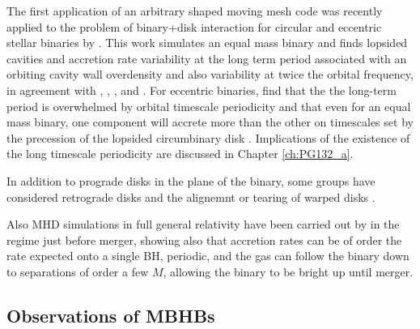 The first application of an arbitrary shaped moving mesh code \citep{AREPO}
was recently applied to the problem of binary+disk interaction for circular
and eccentric stellar binaries by \cite{MunozLai:2016}. This work simulates an
equal mass binary and finds lopsided cavities and accretion rate variability
at the long term period associated with an orbiting cavity wall overdensity
and also variability at twice the orbital frequency, in agreement with
\cite{DHM:2013:MNRAS}, \cite{Farris:2014}, \cite{ShiKrolik:2012}, and
\cite{ShiKrolik:2015}. For eccentric binaries, \cite{MunozLai:2016} find that
the the long-term period is overwhelmed by orbital timescale periodicity and
that even for an equal mass binary, one component will accrete more than the
other on timescales set by the precession of the lopsided circumbinary disk
\citep[see also][]{Dunhill+2015}. Implications of the existence of the long
timescale periodicity are discussed in Chapter \ref{ch:PG132_a}.



In addition to prograde disks in the plane of the binary, some groups have considered retrograde disks \citep{Nixon:2011:LongSim, RoedigSGmigrate:2014, DunhillNixon:2014, BankertShiKrolik:2015, NixonLubow:RetroRes:2015, AmaroSeoane:RetroDiscs:2016} and the alignemnt or tearing of warped disks \citep{NixonKingPringle:2011, Nixon:CntrAlign:2012, Hayasaki:misalignSims:2013, NixonKing:Tear:2013, DoganNixonKingPrice:2015}.

Also MHD simulations in full general relativity have been carried out
by \cite{FarrisLiuShap:2010:Bondi, FarrisShap:2011, FarrisGold:2012,
Gold:GRMHD_CBD:2014, Gold:GRMHD_CBDII:2014} in the regime just before merger,
showing also that accretion rates can be of order the rate expected onto a
single BH, periodic, and the gas can follow the binary down to separations of
order a few $M$, allowing the binary to be bright up until merger.





\subsection{Observations of MBHBs}

